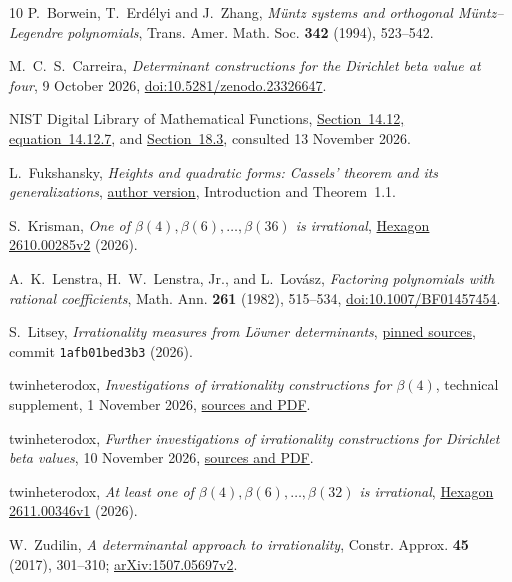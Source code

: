 \begingroup\small
\begin{thebibliography}{10}
 P.~Borwein, T.~Erd\'elyi and J.~Zhang,
\emph{M\"untz systems and orthogonal M\"untz--Legendre polynomials},
Trans. Amer. Math. Soc. \textbf{342} (1994), 523--542.

 M.~C.~S.~Carreira,
\emph{Determinant constructions for the Dirichlet beta value at four},
9 October 2026,
\href{https://doi.org/10.5281/zenodo.23326647}{doi:10.5281/zenodo.23326647}.

 NIST Digital Library of Mathematical Functions,
\href{https://dlmf.nist.gov/14.12.E7}{Section~14.12, equation~14.12.7},
and \href{https://dlmf.nist.gov/18.3}{Section~18.3}, consulted
13 November 2026.

 L.~Fukshansky,
\emph{Heights and quadratic forms: Cassels' theorem and its generalizations},
\href{https://www1.cmc.edu/pages/faculty/lenny/papers/cassels.pdf}{author version},
Introduction and Theorem~1.1.

 S.~Krisman,
\emph{One of $\beta(4),\beta(6),\ldots,\beta(36)$ is irrational},
\href{https://hexagonmath.org/2610.00285v2}{Hexagon 2610.00285v2} (2026).

 A.~K.~Lenstra, H.~W.~Lenstra, Jr., and L.~Lov\'asz,
\emph{Factoring polynomials with rational coefficients},
Math. Ann. \textbf{261} (1982), 515--534,
\href{https://doi.org/10.1007/BF01457454}{doi:10.1007/BF01457454}.

 S.~Litsey,
\emph{Irrationality measures from L\"owner determinants},
\href{https://github.com/slitsey/catalan-irrationality-measure/tree/1afb01bed3b3cc15af87dd75456210b39711f364/paper-trigamma}{pinned sources},
commit \texttt{1afb01bed3b3} (2026).

 twinheterodox,
\emph{Investigations of irrationality constructions for $\beta(4)$},
technical supplement, 1 November 2026,
\href{https://github.com/twinheterodox/beta4/tree/main/supplement}{sources and PDF}.

 twinheterodox,
\emph{Further investigations of irrationality constructions for Dirichlet
beta values}, 10 November 2026,
\href{https://github.com/twinheterodox/beta4/tree/main/further-investigations}{sources and PDF}.

 twinheterodox,
\emph{At least one of $\beta(4),\beta(6),\ldots,\beta(32)$ is irrational},
\href{https://hexagonmath.org/2611.00346v1}{Hexagon 2611.00346v1} (2026).

 W.~Zudilin, \emph{A determinantal approach to irrationality},
Constr. Approx. \textbf{45} (2017), 301--310;
\href{https://arxiv.org/abs/1507.05697v2}{arXiv:1507.05697v2}.
\end{thebibliography}
\endgroup
